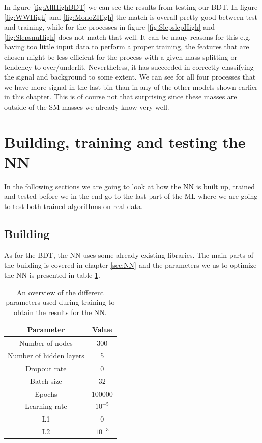 In figure \ref{fig:AllHighBDT} we can see the results from testing our BDT. In figure \ref{fig:WWHigh} and \ref{fig:MonoZHigh} the match is overall pretty good between test and training, while for the processes in figure \ref{fig:SlepslepHigh} and \ref{fig:SlepsnuHigh} does not match that well. It can be many reasons for this e.g. having too little input data to perform a proper training, the features that are chosen might be less efficient for the process with a given mass splitting or tendency to over/underfit. Nevertheless, it has succeeded in correctly classifying the signal and background to some extent. We can see for all four processes that we have more signal in the last bin than in any of the other models shown earlier in this chapter. This is of course not that surprising since these masses are outside of the SM masses we already know very well.



\section{Building, training and testing the NN}
In the following sections we are going to look at how the NN is built up, trained and tested before we in the end go to the last part of the ML where we are going to test both trained algorithms on real data.

\subsection{Building}
As for the BDT, the NN uses some already existing libraries. The main parts of the building is covered in chapter \ref{sec:NN} and the parameters we us to optimize the NN is presented in table \ref{tab:parametersNN}.

\begin{table}[H]
    \centering
    \renewcommand{\arraystretch}{1.}
    \begin{tabular}{c c}
    \toprule
        \textbf{Parameter} & \textbf{Value}\\
        \midrule
        \midrule
        Number of nodes & 300  \\
        Number of hidden layers & 5\\
        Dropout rate & 0\\
        Batch size & 32\\
        Epochs & 100000\\
        Learning rate & $10^{-5}$\\
        L1 & 0\\
        L2 & $10^{-3}$\\
        \bottomrule
    \end{tabular}
    \caption{An overview of the different parameters used during training to obtain the results for the NN.}
    \label{tab:parametersNN}
\end{table}

